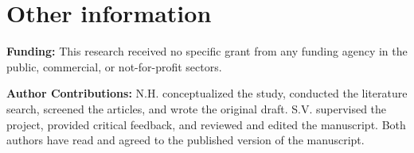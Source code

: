 \documentclass[twocolumn,12pt,a4paper]{article}
\begin{document}
\section{Other information}

\textbf{Funding: }This research received no specific grant from any funding agency in the public, commercial, or not-for-profit sectors.

\textbf{Author Contributions: }N.H. conceptualized the study, conducted the literature search, screened the articles, and wrote the original draft. S.V. supervised the project, provided critical feedback, and reviewed and edited the manuscript. Both authors have read and agreed to the published version of the manuscript.



\nocite{*}

\end{document}
